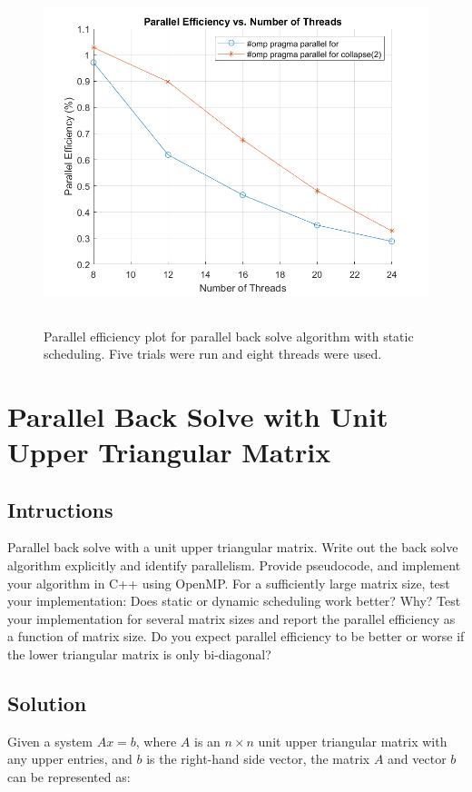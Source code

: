 \documentclass{article}
\begin{document}
\FloatBarrier

\begin{figure}
    \centering
    \includegraphics[height=10cm]{part_1_parr_eff.png}
    \caption{Parallel efficiency plot for parallel back solve algorithm with static scheduling. Five trials were run and eight threads were used.}
    \label{fig:enter-label}
\end{figure}
\FloatBarrier

\section{Parallel Back Solve with Unit Upper Triangular Matrix}
\subsection{Intructions}
Parallel back solve with a unit upper triangular matrix. Write out the back solve algorithm explicitly and identify parallelism. Provide pseudocode, and implement your algorithm in C++ using OpenMP. For a sufficiently large matrix size, test your implementation: Does static or dynamic scheduling work better? Why? Test your implementation for several matrix sizes and report the parallel efficiency as a function of matrix size. Do you expect parallel efficiency to be better or worse if the lower triangular matrix is only bi-diagonal?


\subsection{Solution}
Given a system $Ax = b$, where $A$ is an $n \times n$ unit upper triangular matrix with any upper entries, and $b$ is the right-hand side vector, the matrix $A$ and vector $b$ can be represented as:
\end{document}

